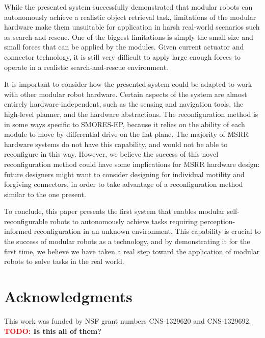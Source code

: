 \documentclass[conference]{IEEEtran}
\newcommand{\TODO}[1]{ {\bf \textcolor{red}{TODO:} #1 }}
\begin{document}
While the presented system successfully demonstrated that modular robots can autonomously achieve a realistic object retrieval task, limitations of the modular hardware make them unsuitable for application in harsh real-world scenarios such as search-and-rescue.  One of the biggest limitations is simply the small size and small forces that can be applied by the modules.  Given current actuator and connector technology, it is still very difficult to apply large enough forces to operate in a realistic search-and-rescue environment. 

It is important to consider how the presented system could be adapted to work with other modular robot hardware.  Certain aspects of the system are almost entirely hardware-independent, such as the sensing and navigation tools, the high-level planner, and the hardware abstractions.  The reconfiguration method is in some ways specific to SMORES-EP, because it relies on the ability of each module to move by differential drive on the flat plane.  The majority of MSRR hardware systems do not have this capability, and would not be able to reconfigure in this way.  However, we believe the success of this novel reconfiguration method could have some implications for MSRR hardware design: future designers might want to consider designing for individual motility and forgiving connectors, in order to take advantage of a reconfiguration method similar to the one present.

To conclude, this paper presents the first system that enables modular self-reconfigurable robots to autonomously achieve tasks requiring perception-informed reconfiguration in an unknown environment.  This capability is crucial to the success of modular robots as a technology, and by demonstrating it for the first time, we believe we have taken a real step toward the application of modular robots to solve tasks in the real world.
%
\section*{Acknowledgments}
%
This work was funded by NSF grant numbers CNS-1329620 and CNS-1329692.
\TODO{Is this all of them?}





\end{document}
